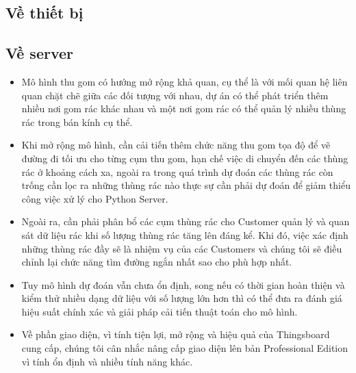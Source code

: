 \subsection{Về thiết bị}
\subsection{Về server}
\begin{itemize}
    \item Mô hình thu gom có hướng mở rộng khả quan, cụ thể là với mối quan hệ liên quan chặt chẽ giữa các đối tượng với nhau, dự án có thể phát triển thêm nhiều nơi gom rác khác nhau và một nơi gom rác có thể quản lý nhiều thùng rác trong bán kính cụ thể.
    \item Khi mở rộng mô hình, cần cải tiến thêm chức năng thu gom tọa độ để vẽ đường đi tối ưu cho từng cụm thu gom, hạn chế việc di chuyển đến các thùng rác ở khoảng cách xa, ngoài ra trong quá trình dự đoán các thùng rác còn trống cần lọc ra những thùng rác nào thực sự cần phải dự đoán để giảm thiểu công việc xử lý cho Python Server.
    \item Ngoài ra, cần phải phân bổ các cụm thùng rác cho Customer quản lý và quan sát dữ liệu rác khi số lượng thùng rác tăng lên đáng kể. Khi đó, việc xác định những thùng rác đầy sẽ là nhiệm vụ của các Customers và chúng tôi sẽ điều chỉnh lại chức năng tìm đường ngắn nhất sao cho phù hợp nhất. 
    \item Tuy mô hình dự đoán vẫn chưa ổn định, song nếu có thời gian hoàn thiện và kiểm thử nhiều dạng dữ liệu với số lượng lớn hơn thì có thể đưa ra đánh giá hiệu suất chính xác và giải pháp cải tiến thuật toán cho mô hình.   
    \item Về phần giao diện, vì tính tiện lợi, mở rộng và hiệu quả của Thingsboard cung cấp, chúng tôi cân nhắc nâng cấp giao diện lên bản Professional Edition vì tính ổn định và nhiều tính năng khác.
\end{itemize}